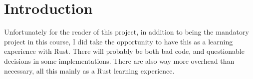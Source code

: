 \section{Introduction}


Unfortunately for the reader of this project, in addition to being the mandatory project in this course, I did take the opportunity to have this as a learning experience with Rust. There will probably be both bad code, and questionable decisions in some implementations. There are also way more overhead than necessary, all this mainly as a Rust learning experience.

